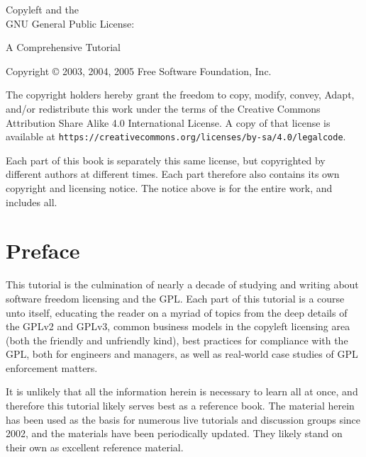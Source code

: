 \documentclass[10pt, letterpaper]{book}
\begin{document}
\pagestyle{plain}

\frontmatter

\begin{titlepage}

\begin{center}

{\Huge
{\sc Copyleft and the  \\

GNU General Public License:

\vspace{.25in}

A Comprehensive Tutorial
}}
\vfill

{\parindent 0in
Copyright \copyright{} 2003, 2004, 2005 \hspace{.2in} Free Software Foundation, Inc.

\vspace{.3in}

The copyright holders hereby grant the freedom to copy, modify, convey,
Adapt, and/or redistribute this work under the terms of the Creative Commons
Attribution Share Alike 4.0 International License.  A copy of that license is
available at \verb=https://creativecommons.org/licenses/by-sa/4.0/legalcode=.

Each part of this book is separately this same license, but copyrighted by
different authors at different times.  Each part therefore also contains its
own copyright and licensing notice.  The notice above is for the entire work,
and includes all.
}
\end{center}
\end{titlepage}

\chapter{Preface}

This tutorial is the culmination of nearly a decade of studying and writing
about software freedom licensing and the GPL\@.  Each part of this tutorial
is a course unto itself, educating the reader on a myriad of topics from the
deep details of the GPLv2 and GPLv3, common business models in the copyleft
licensing area (both the friendly and unfriendly kind), best practices for
compliance with the GPL, both for engineers and managers, as well as
real-world case studies of GPL enforcement matters.

It is unlikely that all the information herein is necessary to learn all at
once, and therefore this tutorial likely serves best as a reference book.
The material herein has been used as the basis for numerous live tutorials
and discussion groups since 2002, and the materials have been periodically
updated.   They likely stand on their own as excellent reference material.
\end{document}
